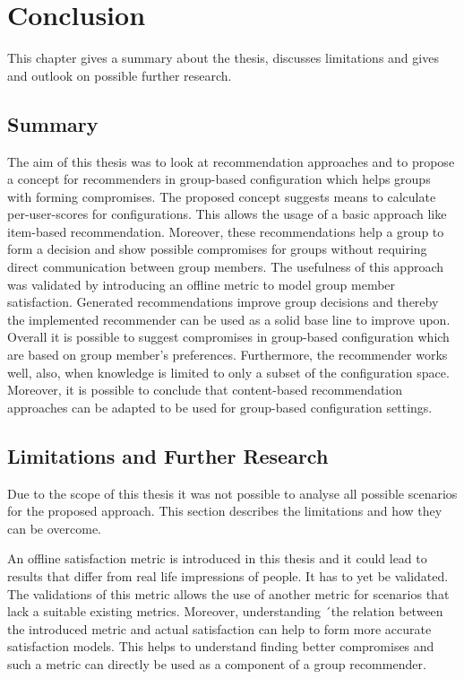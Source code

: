 \chapter{Conclusion}
\label{ch:Conclusion}

This chapter gives a summary about the thesis, discusses limitations and gives and outlook on possible further research.

\section{Summary}
\label{sec:Conclusion:Summary}

The aim of this thesis was to look at recommendation approaches and to propose a concept for recommenders in group-based configuration which helps groups with forming compromises. The proposed concept suggests means to calculate per-user-scores for configurations. This allows the usage of a basic approach like item-based recommendation. Moreover, these recommendations help a group to form a decision and show possible compromises for groups without requiring direct communication between group members. The usefulness of this approach was validated by introducing an offline metric to model group member satisfaction. Generated recommendations improve group decisions and thereby the implemented recommender can be used as a solid base line to improve upon. 
Overall it is possible to suggest compromises in group-based configuration which are based on group member's preferences. Furthermore, the recommender works well, also, when knowledge is limited to only a subset of the configuration space. Moreover, it is possible to conclude that content-based recommendation approaches can be adapted to be used for group-based configuration settings.

\section{Limitations and Further Research}
\label{sec:Conclusion:LimitationsFurtherResearch}

Due to the scope of this thesis it was not possible to analyse all possible scenarios for the proposed approach. This section describes the limitations and how they can be overcome.

An offline satisfaction metric is introduced in this thesis and it could lead to results that differ from real life impressions of people. It has to yet be validated. The validations of this metric allows the use of another metric for scenarios that lack a suitable existing metrics. Moreover, understanding ´the relation between the introduced metric and actual satisfaction can help to form more accurate satisfaction models. This helps to understand finding better compromises and such a metric can directly be used as a component of a group recommender.

